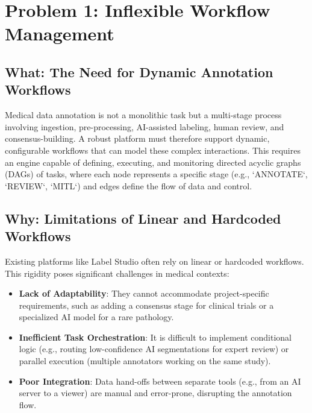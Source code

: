 \section{Problem 1: Inflexible Workflow Management}
\label{sec:problem-workflow}

\subsection{What: The Need for Dynamic Annotation Workflows}
Medical data annotation is not a monolithic task but a multi-stage process involving ingestion, pre-processing, AI-assisted labeling, human review, and consensus-building. A robust platform must therefore support dynamic, configurable workflows that can model these complex interactions. This requires an engine capable of defining, executing, and monitoring directed acyclic graphs (DAGs) of tasks, where each node represents a specific stage (e.g., `ANNOTATE`, `REVIEW`, `MITL`) and edges define the flow of data and control.

\subsection{Why: Limitations of Linear and Hardcoded Workflows}
Existing platforms like Label Studio often rely on linear or hardcoded workflows. This rigidity poses significant challenges in medical contexts:
\begin{itemize}
    \item \textbf{Lack of Adaptability}: They cannot accommodate project-specific requirements, such as adding a consensus stage for clinical trials or a specialized AI model for a rare pathology.
    \item \textbf{Inefficient Task Orchestration}: It is difficult to implement conditional logic (e.g., routing low-confidence AI segmentations for expert review) or parallel execution (multiple annotators working on the same study).
    \item \textbf{Poor Integration}: Data hand-offs between separate tools (e.g., from an AI server to a viewer) are manual and error-prone, disrupting the annotation flow.
\end{itemize}

